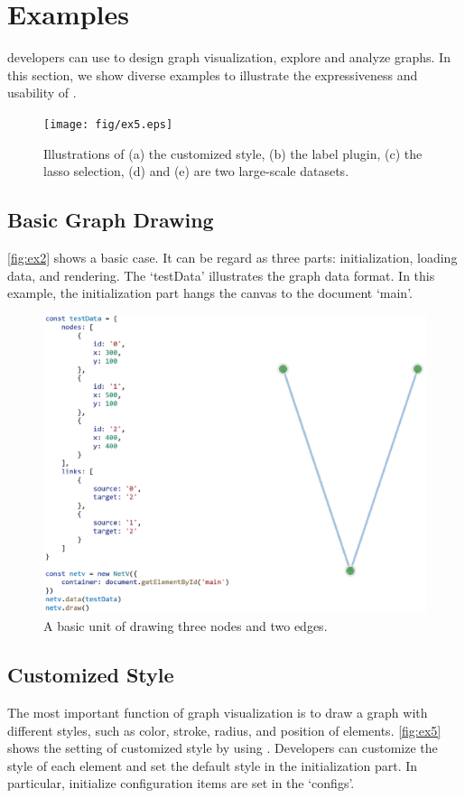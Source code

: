 \section{Examples}
developers can use \name to design graph visualization, explore and analyze graphs. In this section, we show diverse examples to illustrate the expressiveness and usability of \name.
\begin{figure}
    \texttt{[image: fig/ex5.eps]}
    \caption{
        Illustrations of (a) the customized style, (b) the label plugin, (c) the lasso selection, (d) and (e) are two large-scale datasets.
    }
    \label{fig:ex5}
\end{figure}

\subsection{Basic Graph Drawing}
\autoref{fig:ex2} shows a basic case. It can be regard as three parts: initialization, loading data, and rendering. The `testData' illustrates the graph data format. In this example, the initialization part hangs the canvas to the document `main'.
\begin{figure}
    \includegraphics[width=\linewidth]{fig/ex2.eps}
    \caption{
        A basic unit of drawing three nodes and two edges.
    }
    \label{fig:ex2}
\end{figure}

\subsection{Customized Style}
The most important function of graph visualization is to draw a graph with different styles, such as color, stroke, radius, and position of elements.
\autoref{fig:ex5} shows the setting of customized style by using \name. Developers can customize the style of each element and set the default style in the initialization part. In particular, initialize configuration items are set in the `configs'.


